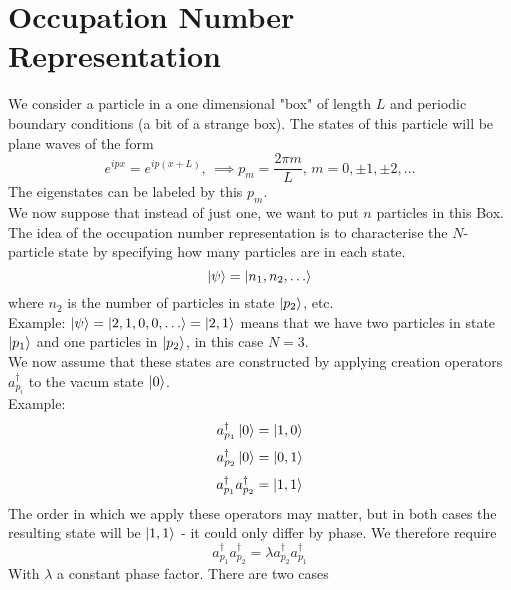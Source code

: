 \documentclass{report}
\begin{document}
\chapter{Occupation Number Representation}
We consider a particle in a one dimensional "box" of length $L$ and periodic boundary conditions (a bit of a strange box). The states of this particle will be plane waves of the form \[
	e^{ipx} = e^{ip(x+L)} \text{, } \implies p_m = \frac{2 \pi m}{L} \text{, } m = 0, \pm 1, \pm 2 ,\ldots
\]  The eigenstates can be labeled by this $p_m$.\\
We now suppose that instead of just one, we want to put $n$ particles in this Box. The idea of the occupation number representation is to characterise the $N$-particle state by specifying how many particles are in each state. \[
\ket{\psi} = \ket{n_1, n_2, \ldots}
\]  where $n_2$ is the number of particles in state $\ket{p_2}$, etc. \\
Example: $\ket{\psi} = \ket{2,1,0,0,\ldots} = \ket{2,1}$ means that we have two particles in state $\ket{p_1}$ and one particles in $\ket{p_2}$, in this case $N = 3$.\\
We now assume that these states are constructed by applying creation operators $a_{p_i}^\dagger$ to the vacum state $\ket{0}$. \\
Example: \[
	a_{p_1}^\dagger \ket{0} = \ket{1,0}
\]\[
	a_{p_2}^\dagger \ket{0} = \ket{0, 1}
\] \[
a_{p_1}^\dagger a_{p_2}^\dagger = \ket{1,1}
\]  The order in which we apply these operators may matter, but in both cases the resulting state will be $\ket{1,1}$ - it could only differ by phase. We therefore require \[
a_{p_1}^\dagger a_{p_2}^\dagger = \lambda a_{p_2}^\dagger a_{p_1}^\dagger
\] With $\lambda $ a constant phase factor. There are two cases
\end{document}
